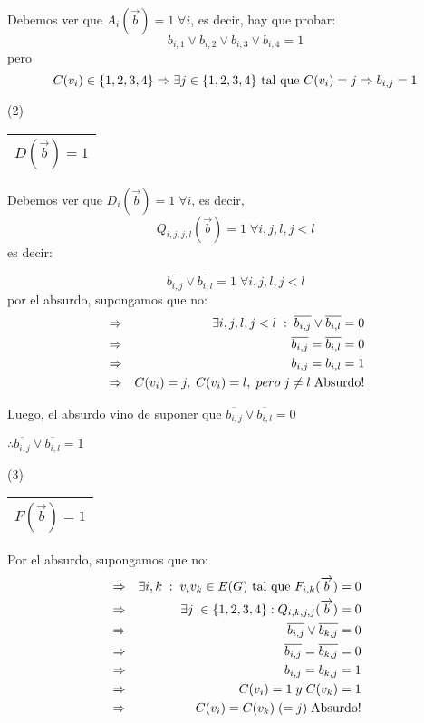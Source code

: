 \documentclass[12pt,a4paper]{report}
\newcounter{neq}
\begin{document}
		Debemos ver que $A_{i}(\overrightarrow{b}) = 1 \; \forall i$, es decir, hay que probar:
		\[ b_{i, 1} \vee b_{i, 2} \vee b_{i, 3} \vee b_{i, 4} = 1 \]
		pero
		\[ C(v_{i}) \in \lbrace 1, 2, 3, 4 \rbrace \Rightarrow \exists j \in \lbrace 1, 2, 3, 4 \rbrace \textup{ tal que } C(v_{i}) = j \Rightarrow b_{i, j} = 1\]

		\vspace{3mm}
		(2) \begin{tabular}{|c|} \hline $D(\overrightarrow{b}) = 1$ \\ \hline \end{tabular}

		Debemos ver que $D_{i}(\overrightarrow{b}) = 1 \; \forall i$, es decir,
		\[ Q_{i, j, j, l}(\overrightarrow{b}) = 1 \; \forall i, j, l,  j < l \] es decir:

		\[ \overline{b_{i, j}} \vee \overline{b_{i, l}} = 1 \; \forall i, j, l, j <  l\]
		por el absurdo, supongamos que no:
		\begin{eqnarray}
			\nonumber &\Rightarrow & \exists i, j, l, j < l \; : \; \overline{b_{i, j}} \vee \overline{b_{i, l}} = 0 \\
			\nonumber &\Rightarrow & \overline{b_{i, j}} = \overline{b_{i, l}} = 0 \\
			\nonumber &\Rightarrow & b_{i, j} = b_{i, l} = 1 \\
			\nonumber &\Rightarrow & C(v_{i}) = j, \; C(v_{i}) = l, \; pero \; j \neq l \; \textup{Absurdo!}
		\end{eqnarray}

		Luego, el absurdo vino de suponer que $\overline{b_{i, j}} \vee \overline{b_{i, l}} = 0$

		\vspace{3mm}
		$\therefore \overline{b_{i, j}} \vee \overline{b_{i, l}} = 1$

		\vspace{3mm}
		(3) \begin{tabular}{|c|} \hline $F(\overrightarrow{b}) = 1$ \\ \hline \end{tabular}
		\vspace{3mm}

		Por el absurdo, supongamos que no:
		\begin{eqnarray}
			\nonumber &\Rightarrow & \exists i, k \; : \; v_{i} v_{k} \in E(G) \textup{ tal que } F_{i, k}(\overrightarrow{b}) = 0 \\
			\nonumber &\Rightarrow & \exists j \; \in \lbrace 1, 2, 3, 4 \rbrace : Q_{i, k, j, j}(\overrightarrow{b}) = 0 \\
			\nonumber &\Rightarrow & \overline{b_{i, j}} \vee \overline{b_{k, j}} = 0 \\
			\nonumber &\Rightarrow & \overline{b_{i, j}} = \overline{b_{k, j}} = 0 \\
			\nonumber &\Rightarrow & b_{i, j} = b_{k, j} = 1 \\
			\nonumber &\Rightarrow & C(v_{i}) = 1\; y \; C(v_{k}) = 1\\
			\nonumber &\Rightarrow & C(v_{i}) = C(v_{k}) \; (= j) \; \textup{Absurdo!}
		\end{eqnarray}
\end{document}
